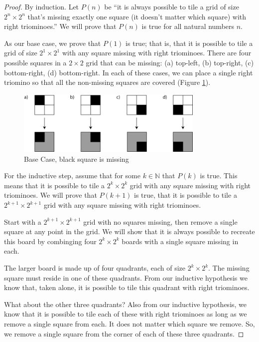 \documentclass[10pt,letter]{article}
\begin{document}
\begin{proof}
By induction. Let $P(n)$ be ``it is always possible to tile a grid of size $2^n \times 2^n$ that's missing exactly one square (it doesn't matter which square) with right triominoes.'' We will prove that $P(n)$ is true for all natural numbers $n$. 

As our base case, we prove that $P(1)$ is true; that is, that it is possible to tile a grid of size $2^1 \times 2^1$ with any square missing with right triominoes. There are four possible squares in a $2 \times 2$ grid that can be missing: (a) top-left, (b) top-right, (c) bottom-right, (d) bottom-right. In each of these cases, we can place a single right triomino so that all the non-missing squares are covered (Figure \ref{fig:tile_base}).

\begin{figure}[h]
    \centering
    \includegraphics[width=0.8\textwidth]{rightTriominoes.png}
    \caption{Base Case, black square is missing}
    \label{fig:tile_base}
\end{figure}

For the inductive step, assume that for some $k \in \mathbb{N}$ that $P(k)$ is true. This means that it is possible to tile a $2^k \times 2^k$ grid with any square missing with right triominoes. We will prove that $P(k+1)$ is true, that it is possible to tile a $2^{k+1} \times 2^{k+1}$ grid with any square missing with right triominoes. 

Start with a $2^{k+1} \times 2^{k+1}$ grid with no squares missing, then remove a single square at any point in the grid. We will show that it is always possible to recreate this board by combinging four $2^k \times 2^k$ boards with a single square missing in each. 

The larger board is made up of four quadrants, each of size $2^k \times 2^k$. The missing square must reside in one of these quadrants. From our inductive hypothesis we know that, taken alone, it is possible to tile this quadrant with right triominoes. 

What about the other three quadrants? Also from our inductive hypothesis, we know that it is possible to tile each of these with right triominoes as long as we remove a single square from each. It does not matter which square we remove. So, we remove a single square from the corner of each of these three quadrants.


\end{proof}
\end{document}
